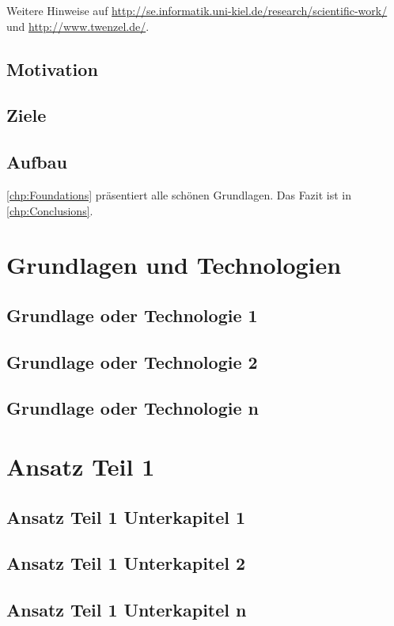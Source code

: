   Weitere Hinweise auf \url{http://se.informatik.uni-kiel.de/research/scientific-work/} und \url{http://www.twenzel.de/}.

  \section{Motivation}
    \blindtext
  \section{Ziele}
    \blindtext
  \section{Aufbau}
    \autoref{chp:Foundations} präsentiert alle schönen Grundlagen. Das Fazit ist in  \autoref{chp:Conclusions}. 

\chapter{Grundlagen und Technologien}\label{chp:Foundations}
  \section{Grundlage oder Technologie 1}
    \blindtext
  \section{Grundlage oder Technologie 2}
    \blindtext
  \section{Grundlage oder Technologie n}
    \blindtext

\chapter{Ansatz Teil 1}\label{chp:Approach1}
  \section{Ansatz Teil 1 Unterkapitel 1}
    \blindtext
  \section{Ansatz Teil 1 Unterkapitel 2}
    \blindtext
  \section{Ansatz Teil 1 Unterkapitel n}
    \blindtext

